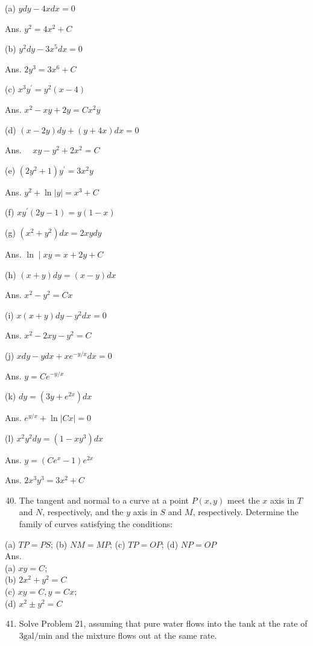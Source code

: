 \documentclass[10pt]{article}
\begin{document}
(a) $y d y-4 x d x=0$

Ans. $y^{2}=4 x^{2}+C$

(b) $y^{2} d y-3 x^{5} d x=0$

Ans. $2 y^{3}=3 x^{6}+C$

(c) $x^{3} y^{\prime}=y^{2}(x-4)$

Ans. $x^{2}-x y+2 y=C x^{2} y$

(d) $(x-2 y) d y+(y+4 x) d x=0$

Ans. $\quad x y-y^{2}+2 x^{2}=C$

(e) $\left(2 y^{2}+1\right) y^{\prime}=3 x^{2} y$

Ans. $y^{2}+\ln |y|=x^{3}+C$

(f) $x y^{\prime}(2 y-1)=y(1-x)$

(g) $\left(x^{2}+y^{2}\right) d x=2 x y d y$

Ans. $\ln \mid x y=x+2 y+C$

(h) $(x+y) d y=(x-y) d x$

Ans. $x^{2}-y^{2}=C x$

(i) $x(x+y) d y-y^{2} d x=0$

Ans. $x^{2}-2 x y-y^{2}=C$

(j) $x d y-y d x+x e^{-y / x} d x=0$

Ans. $y=C e^{-y / x}$

(k) $d y=\left(3 y+e^{2 x}\right) d x$

Ans. $e^{y / x}+\ln |C x|=0$

(l) $x^{2} y^{2} d y=\left(1-x y^{3}\right) d x$

Ans. $y=\left(C e^{x}-1\right) e^{2 x}$

Ans. $2 x^{3} y^{3}=3 x^{2}+C$

\begin{enumerate}
  \setcounter{enumi}{39}
  \item The tangent and normal to a curve at a point $P(x, y)$ meet the $x$ axis in $T$ and $N$, respectively, and the $y$ axis in $S$ and $M$, respectively. Determine the family of curves satisfying the conditions:
\end{enumerate}

(a) $T P=P S$; (b) $N M=M P$; (c) $T P=O P$; (d) $N P=O P$\\
Ans.\\
(a) $x y=C$;\\
(b) $2 x^{2}+y^{2}=C$\\
(c) $x y=C, y=C x$;\\
(d) $x^{2} \pm y^{2}=C$

\begin{enumerate}
  \setcounter{enumi}{40}
  \item Solve Problem 21, assuming that pure water flows into the tank at the rate of $3 \mathrm{gal} / \mathrm{min}$ and the mixture flows out at the same rate.
\end{enumerate}
\end{document}
